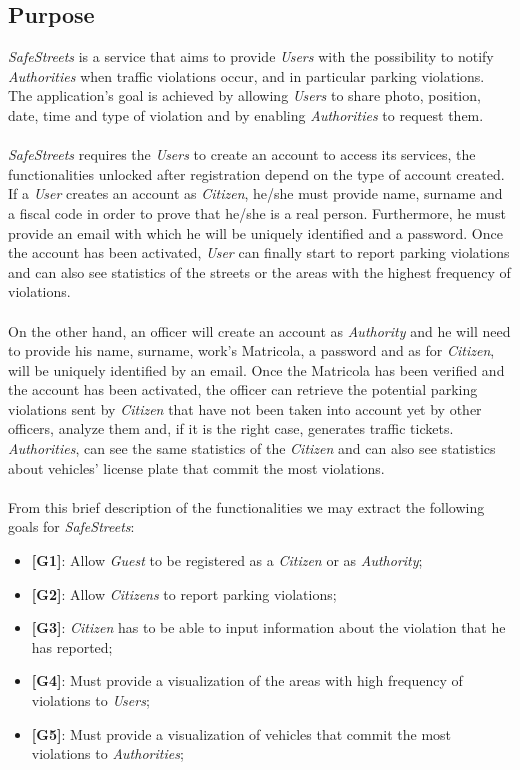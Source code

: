 \documentclass{article}
\begin{document}
\subsection{Purpose}
\textit{SafeStreets} is a service that aims to provide \textit{Users} with the possibility to notify \textit{Authorities} when traffic 
violations occur, and in particular parking violations. The application's goal is achieved by allowing \textit{Users} 
to share photo, position, date, time and type of violation and by enabling \textit{Authorities} to request them.
\\
\\
\textit{SafeStreets} requires the \textit{Users} to create an account to access its services, the functionalities unlocked after 
registration depend on the type of account created.
\\
If a \textit{User} creates an account as \textit{Citizen}, he/she must provide name, surname and a fiscal code in order to prove 
that he/she is a real person. Furthermore, he must provide an email with which he will be uniquely identified 
and a password. Once the account has been activated, \textit{User} can finally start to report parking violations and can also see 
statistics of the streets or the areas with the highest frequency of violations.
\\
\\
On the other hand, an officer will create an account as \textit{Authority} and he will need to provide his name, surname, 
work's Matricola, a password and as for \textit{Citizen}, will be uniquely identified by an email. Once the Matricola 
has been verified and the account has been activated, the officer can retrieve the potential parking violations 
sent by \textit{Citizen} that have not been taken into account yet by other officers, analyze them and, if it is the 
right case, generates traffic tickets. \textit{Authorities}, can see the same statistics of the \textit{Citizen} and can also see
statistics about vehicles' license plate that commit the most violations.
\\
\\
From this brief description of the functionalities we may extract the following goals for \textit{SafeStreets}:
\begin{itemize}
    \item \textbf{[G1]}: Allow \textit{Guest} to be registered as a \textit{Citizen} or as \textit{Authority};
    \item \textbf{[G2]}: Allow \textit{Citizens} to report parking violations;
    \item \textbf{[G3]}: \textit{Citizen} has to be able to input information about the violation that he has reported;
    \item \textbf{[G4]}: Must provide a visualization of the areas with high frequency of violations to \textit{Users};
    \item \textbf{[G5]}: Must provide a visualization of vehicles that commit the most violations to \textit{Authorities}; 

\end{itemize}
\end{document}
